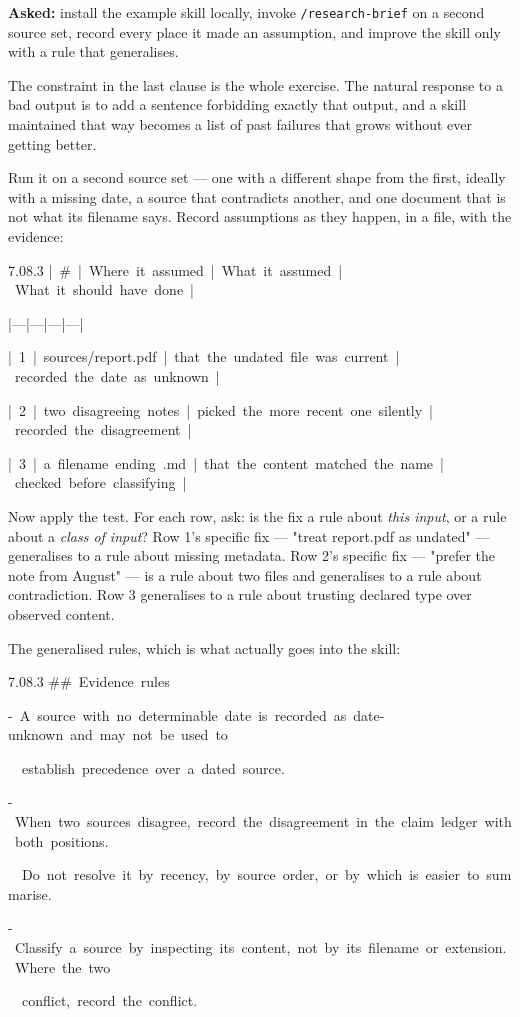 \documentclass[11pt,a4paper,twoside,openany]{book}
\newcommand{\cl}[1]{\noindent\mbox{#1}\par}
\begin{document}
\textbf{Asked:} install the example skill locally, invoke \texttt{/\allowbreak{}research-\allowbreak{}brief} on a second source set, record every place it made an assumption, and improve the skill only with a rule that generalises.


The constraint in the last clause is the whole exercise. The natural response to a bad output is to add a sentence forbidding exactly that output, and a skill maintained that way becomes a list of past failures that grows without ever getting better.


Run it on a second source set — one with a different shape from the first, ideally with a missing date, a source that contradicts another, and one document that is not what its filename says. Record assumptions as they happen, in a file, with the evidence:


\begin{codeblock}{7.0}{8.3}
\cl{|~\#~|~Where~it~assumed~|~What~it~assumed~|~What~it~should~have~done~|}
\cl{|---|---|---|---|}
\cl{|~1~|~sources/report.pdf~|~that~the~undated~file~was~current~|~recorded~the~date~as~unknown~|}
\cl{|~2~|~two~disagreeing~notes~|~picked~the~more~recent~one~silently~|~recorded~the~disagreement~|}
\cl{|~3~|~a~filename~ending~.md~|~that~the~content~matched~the~name~|~checked~before~classifying~|}
\end{codeblock}

Now apply the test. For each row, ask: is the fix a rule about \emph{this input}, or a rule about a \emph{class of input}? Row 1's specific fix — "treat report.pdf as undated" — generalises to a rule about missing metadata. Row 2's specific fix — "prefer the note from August" — is a rule about two files and generalises to a rule about contradiction. Row 3 generalises to a rule about trusting declared type over observed content.


The generalised rules, which is what actually goes into the skill:


\begin{codeblock}{7.0}{8.3}
\cl{\#\#~Evidence~rules}
\cl{-~A~source~with~no~determinable~date~is~recorded~as~date-unknown~and~may~not~be~used~to}
\cl{~~establish~precedence~over~a~dated~source.}
\cl{-~When~two~sources~disagree,~record~the~disagreement~in~the~claim~ledger~with~both~positions.}
\cl{~~Do~not~resolve~it~by~recency,~by~source~order,~or~by~which~is~easier~to~summarise.}
\cl{-~Classify~a~source~by~inspecting~its~content,~not~by~its~filename~or~extension.~Where~the~two}
\cl{~~conflict,~record~the~conflict.}
\end{codeblock}
\end{document}
